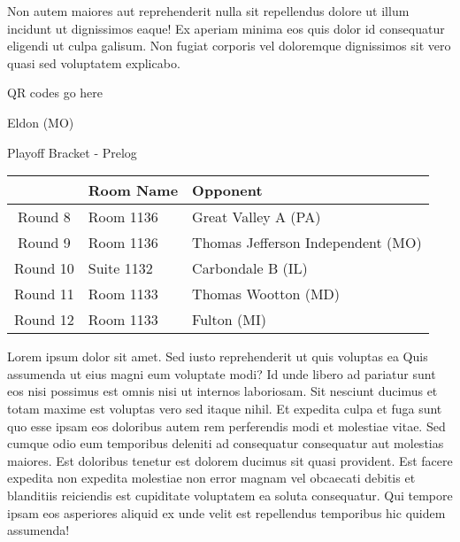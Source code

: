 \documentclass{article}%
\begin{document}
\newline%
Non autem maiores aut reprehenderit nulla sit repellendus dolore ut illum incidunt ut dignissimos eaque! Ex aperiam minima eos quis dolor id consequatur eligendi ut culpa galisum. Non fugiat corporis vel doloremque dignissimos sit vero quasi sed voluptatem explicabo.\newline%
\newline%
%
\vspace*{30pt}%
\begin{center}%
\begin{Huge}%
QR codes go here%
\end{Huge}%
\end{center}%
\newpage%
\begin{center}%
\begin{Huge}%
Eldon (MO)%
\end{Huge}%
\vspace*{8pt}%
\linebreak%
\begin{Large}%
Playoff Bracket {-} Prelog%
\end{Large}%
\end{center}%
\begin{tabularx}{\textwidth}{|c|Y|Y|}%
\hline%
&Room Name&Opponent\\%
\hline%
Round 8&Room 1136&Great Valley A (PA)\\%
Round 9&Room 1136&Thomas Jefferson Independent (MO)\\%
Round 10&Suite 1132&Carbondale B (IL)\\%
Round 11&Room 1133&Thomas Wootton (MD)\\%
Round 12&Room 1133&Fulton (MI)\\%
\hline%
\end{tabularx}%
\vspace*{8pt}%
\linebreak%
\newline%
\newline%
Lorem ipsum dolor sit amet. Sed iusto reprehenderit ut quis voluptas ea Quis assumenda ut eius magni eum voluptate modi? Id unde libero ad pariatur sunt eos nisi possimus est omnis nisi ut internos laboriosam. Sit nesciunt ducimus et totam maxime est voluptas vero sed itaque nihil. Et expedita culpa et fuga sunt quo esse ipsam eos doloribus autem rem perferendis modi et molestiae vitae.\newline%
\newline%
Sed cumque odio eum temporibus deleniti ad consequatur consequatur aut molestias maiores. Est doloribus tenetur est dolorem ducimus sit quasi provident. Est facere expedita non expedita molestiae non error magnam vel obcaecati debitis et blanditiis reiciendis est cupiditate voluptatem ea soluta consequatur. Qui tempore ipsam eos asperiores aliquid ex unde velit est repellendus temporibus hic quidem assumenda!\newline%
\end{document}
